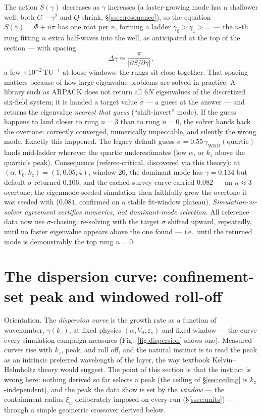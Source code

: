 \documentclass[11pt,a4paper]{article}
\numberwithin{equation}{section}
\theoremstyle{remark}
\newcommand{\eps}{\varepsilon_s}                 %
\newcommand{\Vo}{V_0}
\newcommand{\kz}{k_z}
\begin{document}
The action $S(\gamma)$ decreases as $\gamma$ increases (a faster-growing
mode has a shallower well: both $G-\gamma^2$ and $Q$ shrink,
\S\ref{ssec:resonance}), so the equation $S(\gamma)=\Phi+n\pi$ has one
root per $n$, forming a ladder $\gamma_0>\gamma_1>\dots$ --- the $n$-th
rung fitting $n$ extra half-waves into the well, as anticipated at the
top of the section --- with spacing
\begin{equation}
\Delta\gamma\simeq\frac{\pi}{|\partial S/\partial\gamma|},
\label{eq:ladderspacing}
\end{equation}
a few $\times10^{-2}\,$TU$^{-1}$ at loose windows: the rungs sit close
together. That spacing matters because of how large eigenvalue problems
are solved in practice. A library such as ARPACK does not return all
$6N$ eigenvalues of the discretized six-field system; it is handed a
target value $\sigma$ --- a guess at the answer --- and returns the
eigenvalue \emph{nearest that guess} (``shift-invert'' mode). If the
guess happens to land closer to rung $n=3$ than to rung $n=0$, the
solver hands back the overtone: correctly converged, numerically
impeccable, and silently the wrong mode. Exactly this happened. The
legacy default guess $\sigma=0.55\,\gamma_{\mathrm{WKB}}(\text{quartic})$
lands mid-ladder wherever the quartic underestimates (low $\alpha$, or
$\kz$ above the quartic's peak). Consequence (referee-critical,
discovered via this theory): at $(\alpha,\Vo,\kz)=(1,0.05,4)$, window
20, the dominant mode has $\gamma=0.134$ but default-$\sigma$ returned
$0.106$, and the cached survey curve carried $0.082$ --- an $n\approx3$
overtone; the eigenmode-seeded simulation then faithfully grew the
overtone it was seeded with ($0.081$, confirmed on a stable
fit-window plateau). \emph{Simulation-vs-solver agreement certifies
numerics, not dominant-mode selection.} All reference data now use
$\sigma$-chasing: re-solving with the target $\sigma$ shifted upward,
repeatedly, until no faster eigenvalue appears above the one found ---
i.e.\ until the returned mode is demonstrably the top rung $n=0$.
\section{The dispersion curve: confinement-set peak and windowed roll-off}
\label{sec:peak}

Orientation. The \emph{dispersion curve} is the growth rate as a
function of wavenumber, $\gamma(\kz)$, at fixed physics
$(\alpha,\Vo,\eps)$ and fixed window --- the curve every simulation
campaign measures (Fig.~\ref{fig:dispersion} shows one). Measured
curves rise with $\kz$, peak, and roll off, and the natural instinct
is to read the peak as an intrinsic preferred wavelength of the layer,
the way textbook Kelvin--Helmholtz theory would suggest. The point of
this section is that the instinct is wrong here: nothing derived so far
selects a peak (the ceiling of \S\ref{sec:ceiling} is
$\kz$-independent), and the peak the data show is set by the
\emph{window} --- the containment radius $\xi_w$ deliberately imposed
on every run (\S\ref{ssec:units}) --- through a simple geometric
crossover derived below.
\end{document}
